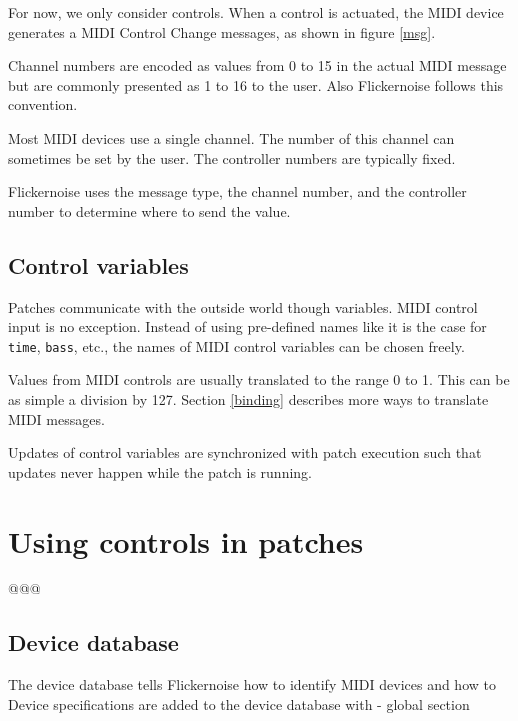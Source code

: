 \documentclass[11pt,a4paper]{article}
\begin{document}
For now, we only consider controls. When a control is actuated, the
MIDI device generates a MIDI Control Change messages, as shown in
figure \ref{msg}.

Channel numbers are encoded as values from 0 to 15 in the actual
MIDI message but are commonly presented as 1 to 16 to the user.
Also Flickernoise follows this convention.

Most MIDI devices use a single channel. The number of this channel
can sometimes be set by the user. The controller numbers are typically
fixed.

Flickernoise uses the message type, the channel number, and the controller
number to determine where to send the value. 




\subsection{Control variables}

Patches communicate with the outside world though variables. MIDI
control input is no exception. Instead of using pre-defined names
like it is the case for {\tt time}, {\tt bass}, etc., the names of
MIDI control variables can be chosen freely.

Values from MIDI controls are usually translated to
the range 0 to 1. This can be as simple a division by 127.
Section \ref{binding} describes more ways to translate MIDI messages.

Updates of control variables are synchronized with patch execution
such that updates never happen while the patch is running.




\section{Using controls in patches}

@@@





\subsection{Device database}

The device database tells Flickernoise how to identify MIDI
devices and how to 
Device specifications are added to the device database with 
- global section
\end{document}
